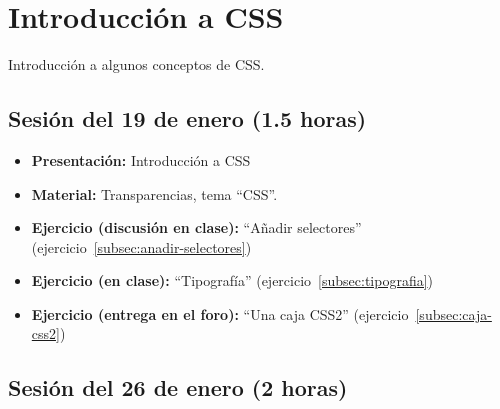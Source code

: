 \documentclass[a4paper,12pt]{report}
\begin{document}
\section{Introducción a CSS}

Introducción a algunos conceptos de CSS.

\subsection{Sesión del 19 de enero (1.5 horas)}

\begin{itemize}
\item \textbf{Presentación:} Introducción a CSS
\item \textbf{Material:} Transparencias, tema ``CSS''.
\item \textbf{Ejercicio (discusión en clase):} ``Añadir selectores'' (ejercicio~\ref{subsec:anadir-selectores})
\item \textbf{Ejercicio (en clase):} ``Tipografía'' (ejercicio~\ref{subsec:tipografia})
\item \textbf{Ejercicio (entrega en el foro):} ``Una caja CSS2'' (ejercicio~\ref{subsec:caja-css2})
\end{itemize}

\subsection{Sesión del 26 de enero (2 horas)}
\end{document}
